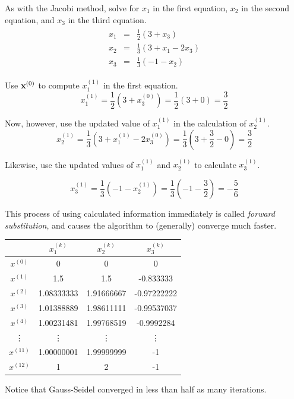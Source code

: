 As with the Jacobi method, solve for $x_1$ in the first equation, $x_2$ in the second equation, and $x_3$ in the third equation.
\begin{align*}
\begin{array}{ccc}
    x_1 & = & \frac{1}{2}(3 + x_3) \\
    x_2 & = & \frac{1}{3}(3 + x_1 - 2x_3) \\
    x_3 & = & \frac{1}{3}(-1 - x_2)
\end{array}
\end{align*}

Use $\mathbf{x}^{(0)}$ to compute $x^{(1)}_1$ in the first equation.
\[x^{(1)}_1 = \frac{1}{2}(3 + x^{(0)}_3) = \frac{1}{2}(3 + 0) = \frac{3}{2}\]

Now, however, use the updated value of $x^{(1)}_1$ in the calculation of $x^{(1)}_2$.
\[x^{(1)}_2 = \frac{1}{3}(3 + x^{(1)}_1 - 2x^{(0)}_3) = \frac{1}{3}(3 + \frac{3}{2} - 0) = \frac{3}{2}\]

Likewise, use the updated values of $x^{(1)}_1$ and $x^{(1)}_2$ to calculate $x^{(1)}_3$.

\[x^{(1)}_3 = \frac{1}{3}(-1 - x^{(1)}_2) = \frac{1}{3}(-1 - \frac{3}{2}) = -\frac{5}{6}\]

This process of using calculated information immediately is called \emph{forward substitution}, and causes the algorithm to (generally) converge much faster.

\begin{center}
\begin{tabular}{c|ccc}
    & $x^{(k)}_1$ & $x^{(k)}_2$ & $x^{(k)}_3$ \\
    \hline
      $x^{(0)}$ & 0 & 0 & 0 \\
      $x^{(1)}$ & 1.5 & 1.5 & -0.833333 \\
      $x^{(2)}$ & 1.08333333 & 1.91666667 & -0.97222222 \\
      $x^{(3)}$ & 1.01388889 & 1.98611111 & -0.99537037 \\
      $x^{(4)}$ & 1.00231481 & 1.99768519 & -0.9992284 \\
      \vdots    & \vdots    & \vdots     & \vdots     \\
      $x^{(11)}$ & 1.00000001 & 1.99999999 & -1 \\
      $x^{(12)}$ & 1 & 2 & -1 \\
\end{tabular}
\end{center}
Notice that Gauss-Seidel converged in less than half as many iterations.

